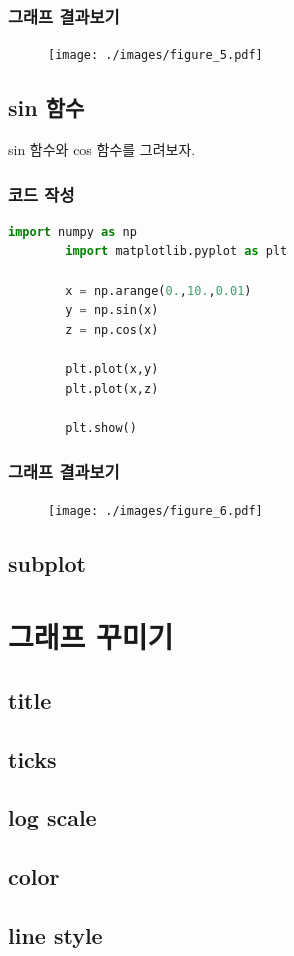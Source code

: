 \documentclass[12pt]{article}
\begin{document}
		\clearpage
		\subsubsection{그래프 결과보기}
		\begin{figure}[h]
			\begin{center}
				\texttt{[image: ./images/figure\_5.pdf]}
			\end{center}
		\end{figure}
	
		\subsection{sin 함수}
		sin 함수와  cos 함수를 그려보자.
		\subsubsection{코드 작성}
		\begin{lstlisting}[style=pstyle, language=Python, caption=simple operation]
		import numpy as np
		import matplotlib.pyplot as plt
		
		x = np.arange(0.,10.,0.01)
		y = np.sin(x)
		z = np.cos(x)
		
		plt.plot(x,y)
		plt.plot(x,z)
		
		plt.show()\end{lstlisting}
		\subsubsection{그래프 결과보기}
		\begin{figure}[h]
			\begin{center}
				\texttt{[image: ./images/figure\_6.pdf]}
			\end{center}
		\end{figure}
	
		\subsection{subplot}
		
	\section{그래프 꾸미기}
		\subsection{title}
		\subsection{ticks}
		\subsection{log scale}
		\subsection{color}
		\subsection{line style}
		
\end{document}

